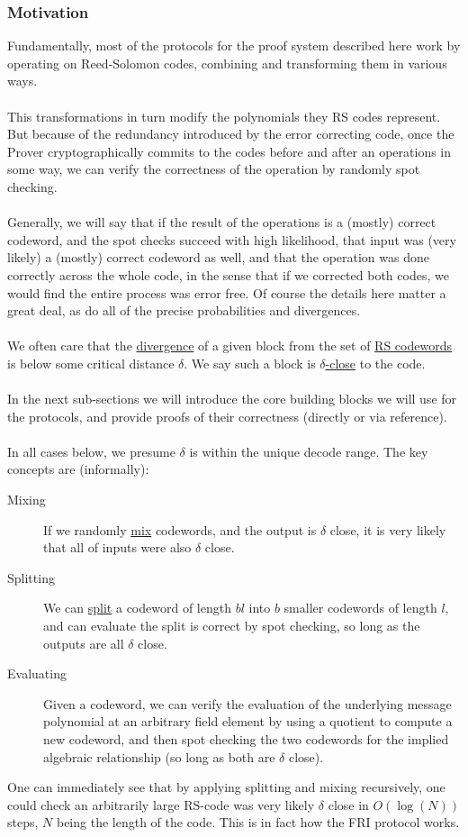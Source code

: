 \documentclass[10pt,letterpaper,titlepage]{article}
\newcommand{\dd}[0]{\delta}
\theoremstyle{definition}
\begin{document}
\begin{appendices}
\subsubsection{Motivation}
Fundamentally, most of the protocols for the proof system described here work by operating on Reed-Solomon codes, combining and transforming them in various ways.\\
\\
This transformations in turn modify the polynomials they RS codes represent.
But because of the redundancy introduced by the error correcting code, once the Prover cryptographically commits to the codes before and after an operations in some way, we can verify the correctness of the operation by randomly spot checking.\\
\\
Generally, we will say that if the result of the operations is a (mostly) correct codeword, and the spot checks succeed with high likelihood, that input was (very likely) a (mostly) correct codeword as well, and that the operation was done correctly across the whole code, in the sense that if we corrected both codes, we would find the entire process was error free.
Of course the details here matter a great deal, as do all of the precise probabilities and divergences.\\
\\
We often care that the \hyperref[divergence]{divergence} of a given block from the set of \hyperref[codeword]{RS codewords} is below some critical distance $\dd$. 
We say such a block is \hyperref[delta-close]{$\dd$-close} to the code.\\
\\
In the next sub-sections we will introduce the core building blocks we will use for the protocols, and provide proofs of their correctness (directly or via reference).\\
\\
In all cases below, we presume $\dd$ is within the unique decode range.
The key concepts are (informally):
\begin{description}
  \item[Mixing] If we randomly \hyperref[mix]{mix} codewords, and the output is $\dd$ close, it is very likely that all of inputs were also $\dd$ close.
  \item[Splitting] We can \hyperref[split]{split} a codeword of length $bl$ into $b$ smaller codewords of length $l$, and can evaluate the split is correct by spot checking, so long as the outputs are all $\dd$ close. 
  \item[Evaluating] Given a codeword, we can verify the evaluation of the underlying message polynomial at an arbitrary field element by using a quotient to compute a new codeword, and then spot checking the two codewords for the implied algebraic relationship (so long as both are $\dd$ close).
\end{description}
\noindent
One can immediately see that by applying splitting and mixing recursively, one could check an arbitrarily large RS-code was very likely $\dd$ close in $O(\log(N))$ steps, $N$ being the length of the code.
This is in fact how the FRI protocol works.

\end{appendices}
\end{document}
